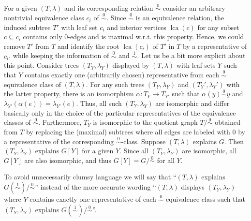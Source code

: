 \documentclass[smallextended]{svjour3}
\newcommand{\Ro}{\mathrel{\overset{0}{\sim}}}
\newcommand{\Rl}{\mathrel{\overset{1}{\sim}}}
\newcommand{\lca}[1]{\mathop{lca}(#1)}
\begin{document}
  For a given $(T,\lambda)$ and its corresponding relation $\Ro$
  consider an arbitrary nontrivial equivalence class $c_i$ of $\Ro$. Since
  $\Ro$ is an equivalence relation, the induced subtree $T'$ with leaf set
  $c_i$ and interior vertices $\lca{c}$ for any subset $c\subseteq c_i$
  contains only 0-edges and is maximal w.r.t. this property. Hence, we
  could remove $T'$ from $T$ and identify the root $\lca{c_i}$ of $T'$ in
  $T$ by a representative of $c_i$, while keeping the information of $\Ro$
  and $\Rl$. Let us be a bit more explicit about this point. Consider trees
  $(T_Y,\lambda_Y)$ displayed by $(T,\lambda)$ with leaf sets $Y$ such that
  $Y$ contains exactly one (arbitrarily chosen) representative from each
  $\Ro$ equivalence class of $(T,\lambda)$.  For any such trees
  $(T_Y,\lambda_Y)$ and $(T_Y',\lambda_Y')$ with the latter property, there
  is an isomorphism $\alpha: T_Y\to T_{Y'}$ such that $\alpha(y)\Ro y$ and
  $\lambda_{Y'}(\alpha(e))=\lambda_{Y'}(e)$. Thus, all such
  $(T_Y,\lambda_Y)$ are isomorphic and differ basically only in the choice
  of the particular representatives of the equivalence classes of $\Ro$.
  Furthermore, $T_{Y}$ is isomorphic to the quotient graph $T/\Ro$ obtained
  from $T$ by replacing the (maximal) subtrees where all edges are labeled
  with $0$ by a representative of the corresponding $\Ro$-class.  Suppose
  $(T,\lambda)$ explains $G$. Then $(T_Y,\lambda_Y)$ explains $G[Y]$ for a
  given $Y$. Since all $(T_Y,\lambda_Y)$ are isomorphic, all $G[Y]$ are
  also isomorphic, and thus $G[Y]=G/\Ro$ for all $Y$.
  
To avoid unnecessarily clumsy language we will say that ``$(T,\lambda)$
explains \hbox{$G(\Rl)/\Ro$}'' instead of the more accurate wording
``$(T,\lambda)$ displays $(T_Y,\lambda_Y)$ where $Y$ contains exactly one
representative of each $\Ro$ equivalence class such that $(T_Y,\lambda_Y)$
explains $G(\Rl)/\Ro$''.
\end{document}
